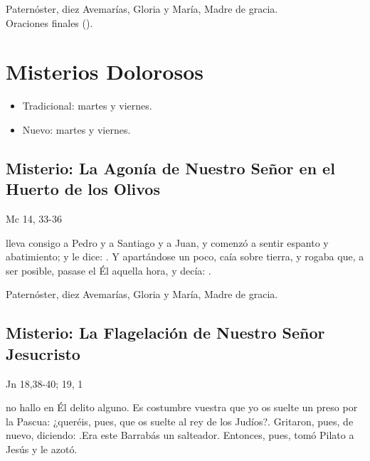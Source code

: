 \documentclass[./00_main.tex]{subfiles}
\newcounter{sorrowful-counter}
\begin{document}
\begin{center}
      Paternóster, diez Avemarías, Gloria y María, Madre de gracia.\\
      Oraciones finales ().
\end{center}

\section*{Misterios Dolorosos}
\begin{itemize}
      \item Tradicional: martes y viernes.
      \item Nuevo: martes y viernes.
\end{itemize}

\subsection*{ Misterio: La Agonía de Nuestro Señor en el Huerto de los Olivos}
\begin{flushright}
      {\color{red}Mc 14, 33-36}
\end{flushright}
 lleva consigo a Pedro y a Santiago y a Juan, y comenzó a sentir espanto y abatimiento; y le dice: . Y apartándose un poco, caía sobre tierra, y rogaba que, a ser posible, pasase el Él aquella hora, y decía: .

\begin{center}
      Paternóster, diez Avemarías, Gloria y María, Madre de gracia.
\end{center}

\subsection*{ Misterio: La Flagelación de Nuestro Señor Jesucristo}
\begin{flushright}
      {\color{red}Jn 18,38-40; 19, 1}
\end{flushright}
 no hallo en Él delito alguno. Es costumbre vuestra que yo os suelte un preso por la Pascua: ¿queréis, pues, que os suelte al rey de los Judíos?{\guillemotright}. 
Gritaron, pues, de nuevo, diciendo: .Era este Barrabás un salteador. Entonces, pues, tomó Pilato a Jesús y le azotó.
\end{document}

